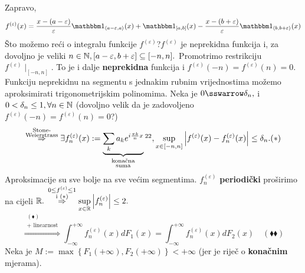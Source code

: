 \documentclass{article}
\begin{document}
Zapravo, \[f^{(\varepsilon)}(x)=\frac{x-(a-\varepsilon)}\varepsilon\mathbbm 1_{\langle a-\varepsilon,a\rangle}(x)+\mathbbm 1_{[a,b]}(x)-\frac{x-(b+\varepsilon)}\varepsilon\mathbbm 1_{\langle b,b+\varepsilon\rangle}(x)\] Što možemo reći o integralu funkcije \(f^{(\varepsilon)}\)?\newline \(f^{(\varepsilon)}\) je neprekidna funkcija i, za dovoljno je veliki \(n\in\Bbb N,[a-\varepsilon,b+\varepsilon]\subseteq[-n,n].\) Promotrimo restrikciju \(f^{(\varepsilon)}\mid_{[-n,n]}.\) To je i dalje \textbf{neprekidna} funkcija i \(f^{(\varepsilon)}(-n)=f^{(\varepsilon)}(n)=0.\) Funkciju neprekidnu na segmentu s jednakim rubnim vrijednostima možemo aproksimirati trigonometrijskim polinomima. Neka je \(0\sswarrow\delta_n,\) i \(0<\delta_n\le1,\forall n\in\Bbb N\) (dovoljno velik da je zadovoljeno \(f^{(\varepsilon)}(-n)=f^{(\varepsilon)}(n)=0\)?) \[\overset{\substack{\text{Stone-}\\\text{Weierstrass}}}{\Rightarrow}\exists f_n^{(\varepsilon)}(x):=\underbrace{\sum_{k}a_ke^{i\frac{\pi k}nx}}_{\substack{\text{konačna}\\\text{suma}}}\footnotemark[22],\sup_{x\in[-n,n]}\left|f^{(\varepsilon)}(x)-f_n^{(\varepsilon)}(x)\right|\le\delta_n.(*)\] Aproksimacije su sve bolje na sve većim segmentima. \newline \(f_n^{(\varepsilon)}\) \textbf{periodički} proširimo na cijeli \(\Bbb R.\) \(\displaystyle\overset{\substack{0\le f^{(\varepsilon)}\le 1\\\text{i }(*)}}{\Rightarrow}\sup_{x\in\Bbb R}\left|f_n^{(\varepsilon)}\right|\le 2.\) \[\overset{\substack{(\blacklozenge)\\+\text{ linearnost}}}{\Rightarrow}\int_{-\infty}^{+\infty}f_n^{(\varepsilon)}(x)dF_1(x)=\int_{-\infty}^{+\infty}f_n^{(\varepsilon)}(x)dF_2(x)\quad(\blacklozenge\blacklozenge)\] Neka je \(M:=\max\left\{F_1(+\infty),F_2(+\infty)\right\}<+\infty\) (jer je riječ o \textbf{konačnim} mjerama).
\end{document}
